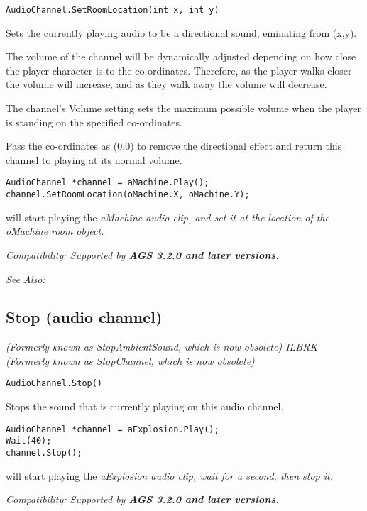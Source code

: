 \begin{verbatim}
AudioChannel.SetRoomLocation(int x, int y)
\end{verbatim}
Sets the currently playing audio to be a directional sound, eminating from (x,y).

The volume of the channel will be dynamically adjusted depending on how close the player
character is to the co-ordinates. Therefore, as the player walks closer the volume will
increase, and as they walk away the volume will decrease.

The channel's Volume setting sets the maximum possible volume when the player is standing
on the specified co-ordinates.

Pass the co-ordinates as (0,0) to remove the directional effect and return this channel
to playing at its normal volume.

\begin{verbatim}
AudioChannel *channel = aMachine.Play();
channel.SetRoomLocation(oMachine.X, oMachine.Y);
\end{verbatim}
will start playing the \it{aMachine} audio clip, and set it at the location of the \it{oMachine}
room object.

\it{Compatibility:} Supported by \bf{AGS 3.2.0} and later versions.

\it{See Also:} 


\subsection{Stop (audio channel)}\label{AudioChannel.Stop}%

\it{(Formerly known as StopAmbientSound, which is now obsolete)} ILBRK
\it{(Formerly known as StopChannel, which is now obsolete)}

\begin{verbatim}
AudioChannel.Stop()
\end{verbatim}
Stops the sound that is currently playing on this audio channel.

\begin{verbatim}
AudioChannel *channel = aExplosion.Play();
Wait(40);
channel.Stop();
\end{verbatim}
will start playing the \it{aExplosion} audio clip, wait for a second, then stop it.

\it{Compatibility:} Supported by \bf{AGS 3.2.0} and later versions.

